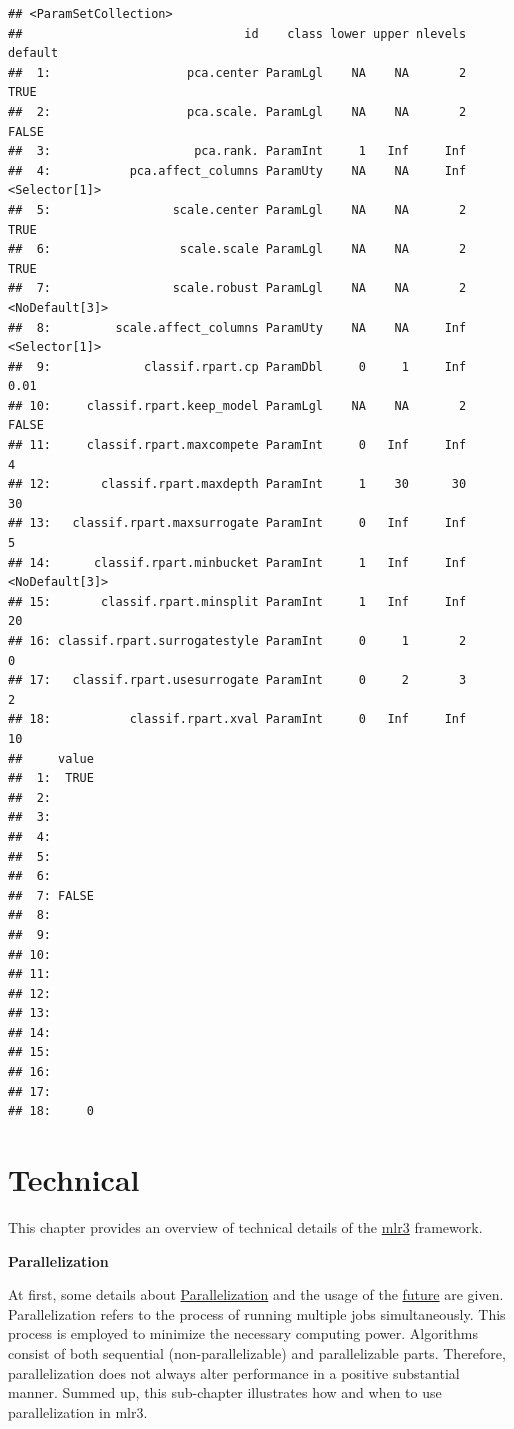 \documentclass[
]{scrbook}
\begin{document}
\begin{verbatim}
## <ParamSetCollection>
##                               id    class lower upper nlevels        default
##  1:                   pca.center ParamLgl    NA    NA       2           TRUE
##  2:                   pca.scale. ParamLgl    NA    NA       2          FALSE
##  3:                    pca.rank. ParamInt     1   Inf     Inf               
##  4:           pca.affect_columns ParamUty    NA    NA     Inf  <Selector[1]>
##  5:                 scale.center ParamLgl    NA    NA       2           TRUE
##  6:                  scale.scale ParamLgl    NA    NA       2           TRUE
##  7:                 scale.robust ParamLgl    NA    NA       2 <NoDefault[3]>
##  8:         scale.affect_columns ParamUty    NA    NA     Inf  <Selector[1]>
##  9:             classif.rpart.cp ParamDbl     0     1     Inf           0.01
## 10:     classif.rpart.keep_model ParamLgl    NA    NA       2          FALSE
## 11:     classif.rpart.maxcompete ParamInt     0   Inf     Inf              4
## 12:       classif.rpart.maxdepth ParamInt     1    30      30             30
## 13:   classif.rpart.maxsurrogate ParamInt     0   Inf     Inf              5
## 14:      classif.rpart.minbucket ParamInt     1   Inf     Inf <NoDefault[3]>
## 15:       classif.rpart.minsplit ParamInt     1   Inf     Inf             20
## 16: classif.rpart.surrogatestyle ParamInt     0     1       2              0
## 17:   classif.rpart.usesurrogate ParamInt     0     2       3              2
## 18:           classif.rpart.xval ParamInt     0   Inf     Inf             10
##     value
##  1:  TRUE
##  2:      
##  3:      
##  4:      
##  5:      
##  6:      
##  7: FALSE
##  8:      
##  9:      
## 10:      
## 11:      
## 12:      
## 13:      
## 14:      
## 15:      
## 16:      
## 17:      
## 18:     0
\end{verbatim}

\hypertarget{technical}{%
\chapter{Technical}\label{technical}}

This chapter provides an overview of technical details of the \href{https://mlr3.mlr-org.com}{mlr3} framework.

\textbf{Parallelization}

At first, some details about \protect\hyperlink{parallelization}{Parallelization} and the usage of the \href{https://cran.r-project.org/package=future}{future} are given.
Parallelization refers to the process of running multiple jobs simultaneously.
This process is employed to minimize the necessary computing power.
Algorithms consist of both sequential (non-parallelizable) and parallelizable parts.
Therefore, parallelization does not always alter performance in a positive substantial manner.
Summed up, this sub-chapter illustrates how and when to use parallelization in mlr3.
\end{document}
